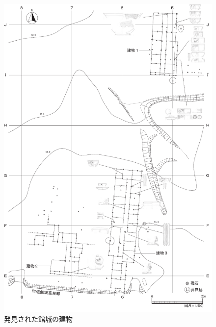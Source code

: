 \documentclass[11pt,report]{jsbook}
\begin{document}
\begin{figure}[h]
\centering
\includegraphics[width=150truemm]{fig/11.pdf}
\caption{発見された館城の建物}
\label{fig11}
\end{figure}
\end{document}
